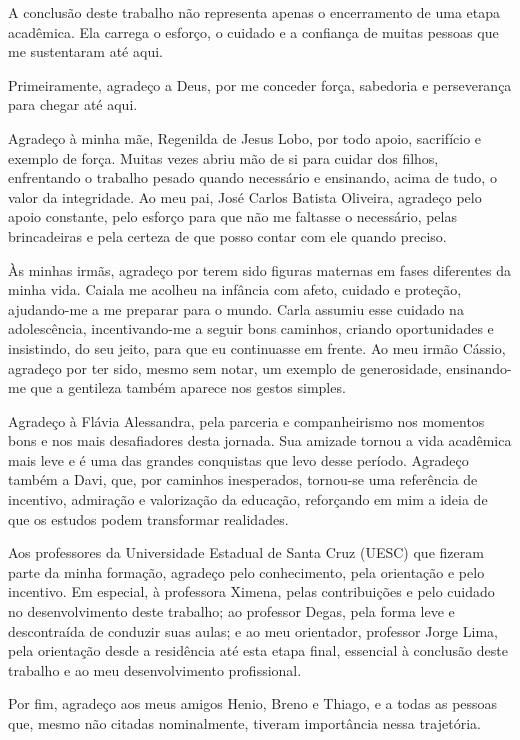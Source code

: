 \begin{agradecimentos}

A conclusão deste trabalho não representa apenas o encerramento de uma etapa acadêmica. Ela carrega o esforço, o cuidado e a confiança de muitas pessoas que me sustentaram até aqui.

Primeiramente, agradeço a Deus, por me conceder força, sabedoria e perseverança para chegar até aqui.

Agradeço à minha mãe, Regenilda de Jesus Lobo, por todo apoio, sacrifício e exemplo de força. Muitas vezes abriu mão de si para cuidar dos filhos, enfrentando o trabalho pesado quando necessário e ensinando, acima de tudo, o valor da integridade. Ao meu pai, José Carlos Batista Oliveira, agradeço pelo apoio constante, pelo esforço para que não me faltasse o necessário, pelas brincadeiras e pela certeza de que posso contar com ele quando preciso.

Às minhas irmãs, agradeço por terem sido figuras maternas em fases diferentes da minha vida. Caiala me acolheu na infância com afeto, cuidado e proteção, ajudando-me a me preparar para o mundo. Carla assumiu esse cuidado na adolescência, incentivando-me a seguir bons caminhos, criando oportunidades e insistindo, do seu jeito, para que eu continuasse em frente. Ao meu irmão Cássio, agradeço por ter sido, mesmo sem notar, um exemplo de generosidade, ensinando-me que a gentileza também aparece nos gestos simples.

Agradeço à Flávia Alessandra, pela parceria e companheirismo nos momentos bons e nos mais desafiadores desta jornada. Sua amizade tornou a vida acadêmica mais leve e é uma das grandes conquistas que levo desse período. Agradeço também a Davi, que, por caminhos inesperados, tornou-se uma referência de incentivo, admiração e valorização da educação, reforçando em mim a ideia de que os estudos podem transformar realidades.

Aos professores da Universidade Estadual de Santa Cruz (UESC) que fizeram parte da minha formação, agradeço pelo conhecimento, pela orientação e pelo incentivo. Em especial, à professora Ximena, pelas contribuições e pelo cuidado no desenvolvimento deste trabalho; ao professor Degas, pela forma leve e descontraída de conduzir suas aulas; e ao meu orientador, professor Jorge Lima, pela orientação desde a residência até esta etapa final, essencial à conclusão deste trabalho e ao meu desenvolvimento profissional.

Por fim, agradeço aos meus amigos Henio, Breno e Thiago, e a todas as pessoas que, mesmo não citadas nominalmente, tiveram importância nessa trajetória.

\end{agradecimentos}

